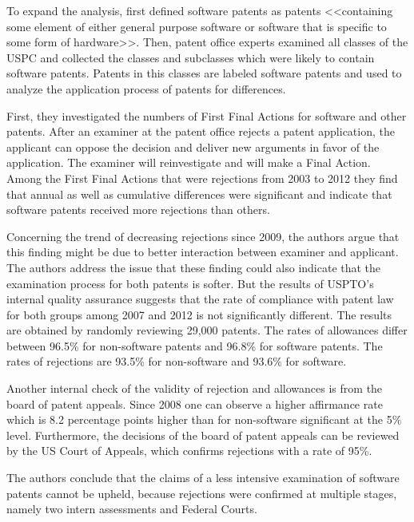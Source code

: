 \documentclass[12pt, a4paper]{scrartcl}
\theoremstyle{definition}
\begin{document}
To expand the analysis, \citeauthor{graham2013smart} first defined software
patents as patents <<containing some element of either general purpose software
or software that is specific to some form of
hardware>>\citep[p.~75]{graham2013smart}. Then, patent office experts examined
all classes of the USPC and collected the classes and subclasses which were
likely to contain software patents. Patents in this classes are labeled
software patents and used to analyze the application process of patents for
differences.

First, they investigated the numbers of First Final Actions for software and
other patents. After an examiner at the patent office rejects a patent
application, the applicant can oppose the decision and deliver new arguments in
favor of the application. The examiner will reinvestigate and will make a Final
Action. Among the First Final Actions that were rejections from 2003 to 2012
they find that annual as well as cumulative differences were significant and
indicate that software patents received more rejections than others.

Concerning the trend of decreasing rejections since 2009, the authors argue
that this finding might be due to better interaction between examiner and
applicant. The authors address the issue that these finding could also indicate
that the examination process for both patents is softer. But the results of
USPTO's internal quality assurance suggests that the rate of compliance with
patent law for both groups among 2007 and 2012 is not significantly different.
The results are obtained by randomly reviewing 29,000 patents. The rates of
allowances differ between 96.5\% for non-software patents and 96.8\% for
software patents. The rates of rejections are 93.5\% for non-software and
93.6\% for software.

Another internal check of the validity of rejection and allowances is from the
board of patent appeals. Since 2008 one can observe a higher affirmance rate
which is 8.2 percentage points higher than for non-software significant at the
5\% level. Furthermore, the decisions of the board of patent appeals can be
reviewed by the US Court of Appeals, which confirms rejections with a rate of
95\%.

The authors conclude that the claims of a less intensive examination of
software patents cannot be upheld, because rejections were confirmed at
multiple stages, namely two intern assessments and Federal Courts.

\end{document}
